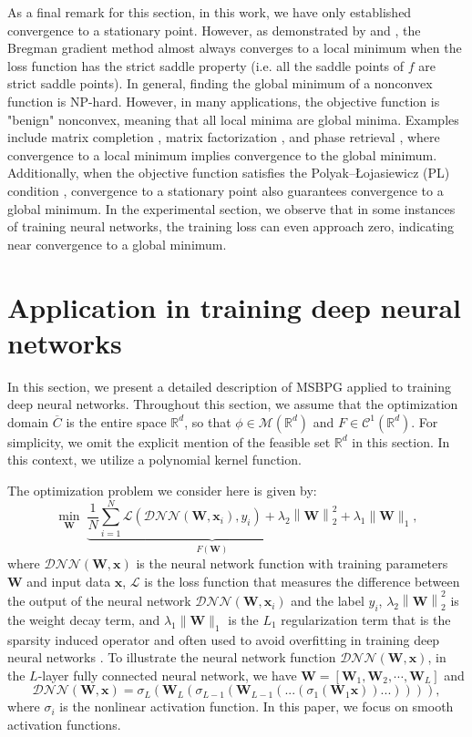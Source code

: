 \documentclass[twoside,11pt]{article}
\newcommand{\be}{\begin{equation}}
\newcommand{\ee}{\end{equation}}
\newcommand{\R}{\mathbb R}
\newcommand{\cC}{\mathcal C}
\newcommand{\cL}{\mathcal L}
\newcommand{\cM}{\mathcal M}
\def\norm#1{\left\|#1\right\|}
\def\vx{{\bm{x}}}
\def\mW{{\bm{W}}}
\begin{document}
{As a final remark for this section, in this work, we have only established convergence to a stationary point. However, as demonstrated by \citep{lee2019first} and \citep{panageas2019first}, the Bregman gradient method almost always converges to a local minimum when the loss function has the strict saddle property (i.e. all the saddle points of $f$ are strict saddle points). In general, finding the global minimum of a nonconvex function is NP-hard. However, in many applications, the objective function is  "benign" nonconvex, meaning that all local minima are global minima. Examples include matrix completion \citep{ge2016matrix}, matrix factorization \citep{chi2019nonconvex}, and phase retrieval \citep{sun2018geometric}, where convergence to a local minimum implies convergence to the global minimum. Additionally, when the objective function satisfies the Polyak–Łojasiewicz (PL) condition \citep{polyak1963gradient}, convergence to a stationary point also guarantees convergence to a global minimum.  In the experimental section, we observe that in some instances of training neural networks, the training loss can even approach zero, indicating near convergence to a global minimum.
}

\section{Application in training deep neural networks}\label{DNN implementation}
In this section, we present a detailed description of MSBPG applied to training deep neural networks. Throughout this section, we assume that the optimization domain $\overline{C}$ is the entire space $\R^d$, so that $\phi\in\cM(\R^d)$ and $F\in\cC^1(\R^d)$. For simplicity, we omit the explicit mention of the feasible set $\R^d$ in this section. In this context, we utilize a polynomial kernel function.

The optimization problem we consider here is given by:
\be 
\min_{\mW}\;\underbrace{\frac{1}{N}\sum_{i=1}^N\cL(\mathcal{DNN}(\mW,\vx_i),y_i)+\lambda_2\norm{\mW}_2^2}_{F(\mW)}+\lambda_1\|\mW\|_1,
\label{DNN-loss-model}
\ee 
where $\mathcal{DNN}({\mW},\vx)$ is the neural network function with training parameters $\mW$ and input data $\vx$, $\mathcal{L}$ is the loss function that measures the difference between the output of the neural network $\mathcal{DNN}({\mW},\vx_i)$ and the label $y_i$, $\lambda_2\norm{\mW}_2^2$ is the weight decay term, and $\lambda_1 \|\mW\|_1$ is the $L_1$ regularization term that is the sparsity induced operator and often used to avoid overfitting in training deep neural networks \citep{ng2004feature}. To illustrate the neural network function $\mathcal{DNN}({\mW},\vx)$, in the $L$-layer fully connected neural network, we have $\mW=[\mW_1,\mW_2,\cdots,\mW_L]$ and
\begin{equation}
\mathcal{DNN}(\mW,\vx)=\sigma_L(\mW_L(\sigma_{L-1}(\mW_{L-1}(...(\sigma_1(\mW_1\vx))...)))),
\label{DNN-def}
\end{equation}
where $\sigma_i$ is the nonlinear activation function. In this paper, we focus on smooth activation functions.
\end{document}
